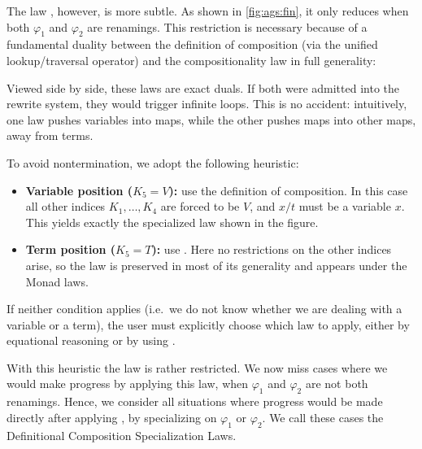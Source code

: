 \documentclass[screen,nonacm]{acmart}
\begin{document}
The law , however, is more subtle. As shown in
\cref{fig:ags:fin}, it only reduces when both $\varphi_1$ and $\varphi_2$ are
renamings. This restriction is necessary because of a fundamental duality
between the definition of composition (via the unified lookup/traversal
operator) and the compositionality law in full generality:

\begin{minipage}{0.48\linewidth}
      \raggedright{}
      \ECompGeneral{}
\end{minipage}
\begin{minipage}{0.48\linewidth}
      \raggedright{}
      \ECompoGeneral{}
\end{minipage}

Viewed side by side, these laws are exact duals. If both were admitted into the
rewrite system, they would trigger infinite loops. This is no accident:
intuitively, one law pushes variables into maps, while the other pushes maps
into other maps, away from terms.

To avoid nontermination, we adopt the following heuristic:
\begin{itemize}
      \item \textbf{Variable position ($K_5 = V$):} use the definition of
            composition. In this case all other indices $K_1,\dots,K_4$ are forced
            to be $V$, and $x/t$ must be a variable $x$. This yields exactly the
            specialized  law shown in the figure.
      \item \textbf{Term position ($K_5 = T$):} use . Here no
            restrictions on the other indices arise, so the law is preserved in
            most of its generality and appears under the Monad laws.
\end{itemize}

\noindent If neither condition applies (i.e.\ we do not know whether we are dealing with
a variable or a term), the user must explicitly choose which law to apply,
either by equational reasoning or by using .

With this heuristic the  law is rather restricted. We now
miss cases where we would make progress by applying this law, when $\varphi_1$
and $\varphi_2$ are not both renamings. Hence, we consider all
situations where progress would be made directly after applying , by specializing on $\varphi_1$ or
$\varphi_2$. We call these cases the Definitional Composition Specialization
Laws. 
\end{document}
